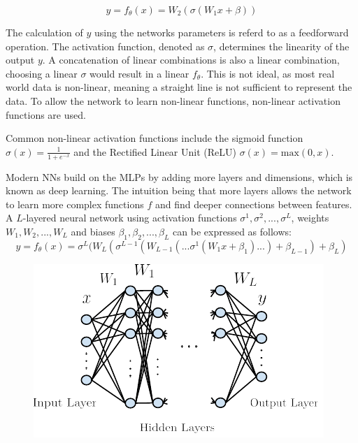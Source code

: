 \begin{equation}
    y = f_\theta(x) = W_2(\sigma(W_1 x + \beta))
\end{equation}

The calculation of $y$ using the networks parameters is referd to as a feedforward operation.
The activation function, denoted as $\sigma$, determines the linearity of the output $y$. 
A concatenation of linear combinations is also a linear combination, choosing a linear $\sigma$ would result in a linear $f_\theta$.
This is not ideal, as most real world data is non-linear, meaning a straight line is not sufficient to represent the data. 
To allow the network to learn non-linear functions, non-linear activation functions are used.

Common non-linear activation functions include the sigmoid function $\sigma(x) = \frac{1}{1+e^{-x}}$ and the Rectified Linear Unit (ReLU) $\sigma(x) = \text{max}(0, x)$. 

Modern NNs build on the MLPs by adding more layers and dimensions, which is known as deep learning. The intuition being that more layers allows the network to learn more complex functions $f$ and find deeper connections between features.
A $L$-layered neural network using activation functions $\sigma^1, \sigma^2, ..., \sigma^L$, weights $W_1, W_2, ..., W_L$ and biases $\beta_1, \beta_2, ..., \beta_L$ can be expressed as follows:
\begin{equation}
    y = f_\theta(x) = \sigma^L(W_L(\sigma^{L-1}(W_{L-1}(...\sigma^1(W_1 x + \beta_1)...)+\beta_{L-1}) + \beta_L)
\end{equation}
\begin{figure}[H]
    \includegraphics[scale=1]{figures/figure-pdf/NN2.pdf}
\end{figure}

